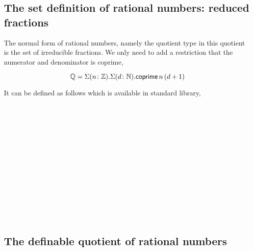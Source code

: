 \subsection{The set definition of rational numbers: reduced fractions}

The normal form of rational numbers, namely the quotient type in this quotient is the set of irreducible fractions. We only need to add a restriction that the numerator and denominator is coprime,

$$\mathbb{Q} = \Sigma (n \colon \mathbb{Z}). \Sigma (d \colon \mathbb{N}). \mathsf{coprime} \,n \,(d +1)$$

It can be defined as follows which is available in standard library,

\begin{code}
\\
\>  \AgdaSymbol{:}  \<%
\\
\>[0]\<[2]%
\>[2]\<%
\\
\>[2]\<[4]%
\>[4] \<[18]%
\>[18]\AgdaSymbol{:} \<%
\\
\>[2]\<[4]%
\>[4] \AgdaSymbol{:} \<%
\\
\>[2]\<[4]%
\>[4] \<[18]%
\>[18]\AgdaSymbol{:}  \AgdaSymbol{(}    \AgdaSymbol{(} \AgdaSymbol{))}\<%
\\
%
\\
\>[0]\<[2]%
\>[2] \AgdaSymbol{:} \<%
\\
\>[0]\<[2]%
\>[2] \AgdaSymbol{=} \AgdaInductiveConstructor{+}  \<%
\\
%
\\
\>[0]\<[2]%
\>[2] \AgdaSymbol{:}   \<%
\\
\>[0]\<[2]%
\>[2] \AgdaSymbol{=}  \<%
\\
\end{code}

\subsection{The definable quotient of rational numbers}

